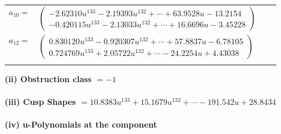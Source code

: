 \documentclass[1p]{elsarticle_modified}
\theoremstyle{definition}
\begin{document}
\begin{tabular}{m{7pt} m{180pt} m{7pt} m{180pt} }
\flushright $a_{10}=$&$\begin{pmatrix}-2.62310 u^{133}-2.19393 u^{132}+\cdots+63.9528 u-13.2154\\-0.420115 u^{133}-2.13033 u^{132}+\cdots+16.6696 u-3.45228\end{pmatrix}$ \\
\flushright $a_{12}=$&$\begin{pmatrix}0.830120 u^{133}-0.920307 u^{132}+\cdots+57.8837 u-6.78105\\0.724769 u^{133}+2.05722 u^{132}+\cdots-24.2254 u+4.43038\end{pmatrix}$\\&\end{tabular}
\flushleft \textbf{(ii) Obstruction class $= -1$}\\~\\
\flushleft \textbf{(iii) Cusp Shapes $= 10.8383 u^{133}+15.1679 u^{132}+\cdots-191.542 u+28.8434$}\\~\\
\newpage\renewcommand{\arraystretch}{1}
\flushleft \textbf{(iv) u-Polynomials at the component}\newline \\
\end{document}
